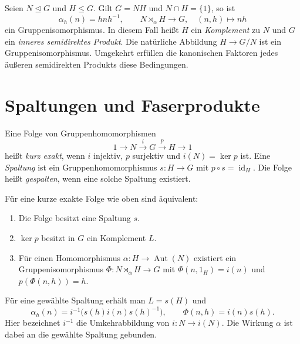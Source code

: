 \begin{theorem}
\label{b40guide:thm:internal-semidirect}
Seien $N\trianglelefteq G$ und $H\leq G$. Gilt
$G=NH$ und $N\cap H=\{1\}$, so ist
\[
 \alpha_h(n)=hnh^{-1},\qquad
 N\rtimes_\alpha H\longrightarrow G,\quad(n,h)\longmapsto nh
\]
ein Gruppenisomorphismus. In diesem Fall heißt $H$ ein
\emph{Komplement} zu $N$ und $G$ ein \emph{inneres semidirektes Produkt}.
Die natürliche Abbildung $H\to G/N$ ist ein Gruppenisomorphismus.
Umgekehrt erfüllen die kanonischen Faktoren jedes äußeren semidirekten
Produkts diese Bedingungen.
\cite{milne,conradsemi}
\end{theorem}

\section{Spaltungen und Faserprodukte}

\begin{definition}
\label{b40guide:def:split-exact}
Eine Folge von Gruppenhomomorphismen
\[
 1\longrightarrow N\xrightarrow{i}G\xrightarrow{p}H
 \longrightarrow1
\]
heißt \emph{kurz exakt}, wenn $i$ injektiv, $p$ surjektiv und
$i(N)=\ker p$ ist. Eine \emph{Spaltung} ist ein Gruppenhomomorphismus
$s:H\to G$ mit $p\circ s=\operatorname{id}_H$.
Die Folge heißt \emph{gespalten}, wenn eine solche Spaltung existiert.
\end{definition}

\begin{theorem}
\label{b40guide:thm:split-equivalence}
Für eine kurze exakte Folge wie oben sind äquivalent:
\begin{enumerate}
\item Die Folge besitzt eine Spaltung $s$.
\item $\ker p$ besitzt in $G$ ein Komplement $L$.
\item Für einen Homomorphismus $\alpha:H\to\operatorname{Aut}(N)$
existiert ein Gruppenisomorphismus
$\Phi:N\rtimes_\alpha H\to G$ mit
$\Phi(n,1_H)=i(n)$ und $p(\Phi(n,h))=h$.
\end{enumerate}
Für eine gewählte Spaltung erhält man $L=s(H)$ und
\[
 \alpha_h(n)=i^{-1}\bigl(s(h)i(n)s(h)^{-1}\bigr),\qquad
 \Phi(n,h)=i(n)s(h).
\]
Hier bezeichnet $i^{-1}$ die Umkehrabbildung von $i:N\to i(N)$.
Die Wirkung $\alpha$ ist dabei an die gewählte Spaltung gebunden.
\cite{milne,conradsplit}
\end{theorem}

